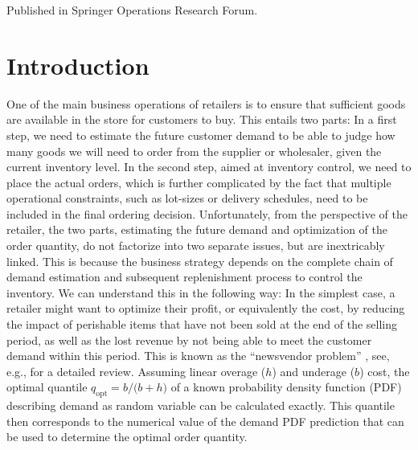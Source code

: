\documentclass[BCOR=1mm, DIV=calc,10pt,
twoside=true,
twocolumn,
headings=normal]{scrartcl}
\begin{document}
{Published in Springer Operations Research Forum.}


\section{Introduction}
\label{sec:Intro}

One of the main business operations of retailers is to ensure that sufficient goods are available in the store for customers to buy. This entails two parts: In a first step, we need to estimate the future customer demand to be able to judge how many goods we will need to order from the supplier or wholesaler, given the current inventory level. In the second step, aimed at inventory control, we need to place the actual orders, which is further complicated by the fact that multiple operational constraints, such as lot-sizes or delivery schedules, need to be included in the final ordering decision. Unfortunately, from the perspective of the retailer, the two parts, estimating the future demand and optimization of the order quantity, do not factorize into two separate issues, but are inextricably linked. This is because the business strategy depends on the complete chain of demand estimation and subsequent replenishment process to control the inventory. We can understand this in the following way: In the simplest case, a retailer might want to optimize their profit, or equivalently the cost, by reducing the impact of perishable items that have not been sold at the end of the selling period, as well as the lost revenue by not being able to meet the customer demand within this period. This is known as the ``newsvendor problem'' \cite{Edgeworth}, see, e.g., \cite{Khouja1999537} for a detailed review. Assuming linear overage ($h$) and underage ($b$) cost, the optimal quantile $q_{\mathrm{opt}} = {b}/{(b+h})$ of a known probability density function (PDF) describing demand as random variable can be calculated exactly. This quantile then corresponds to the numerical value of the demand PDF prediction that can be used to determine the optimal order quantity.
\end{document}
